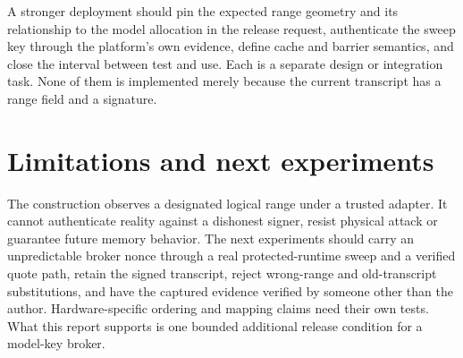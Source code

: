 \documentclass[10pt,letterpaper]{article}
\let\plainsection\section
\renewcommand{\section}{\Needspace{6\baselineskip}\plainsection}
\begin{document}
A stronger deployment should pin the expected range geometry and its relationship to the model allocation in the release request, authenticate the sweep key through the platform's own evidence, define cache and barrier semantics, and close the interval between test and use. Each is a separate design or integration task. None of them is implemented merely because the current transcript has a range field and a signature.


\section{Limitations and next experiments}

The construction observes a designated logical range under a trusted adapter. It cannot authenticate reality against a dishonest signer, resist physical attack or guarantee future memory behavior. The next experiments should carry an unpredictable broker nonce through a real protected-runtime sweep and a verified quote path, retain the signed transcript, reject wrong-range and old-transcript substitutions, and have the captured evidence verified by someone other than the author. Hardware-specific ordering and mapping claims need their own tests. What this report supports is one bounded additional release condition for a model-key broker.





\end{document}
